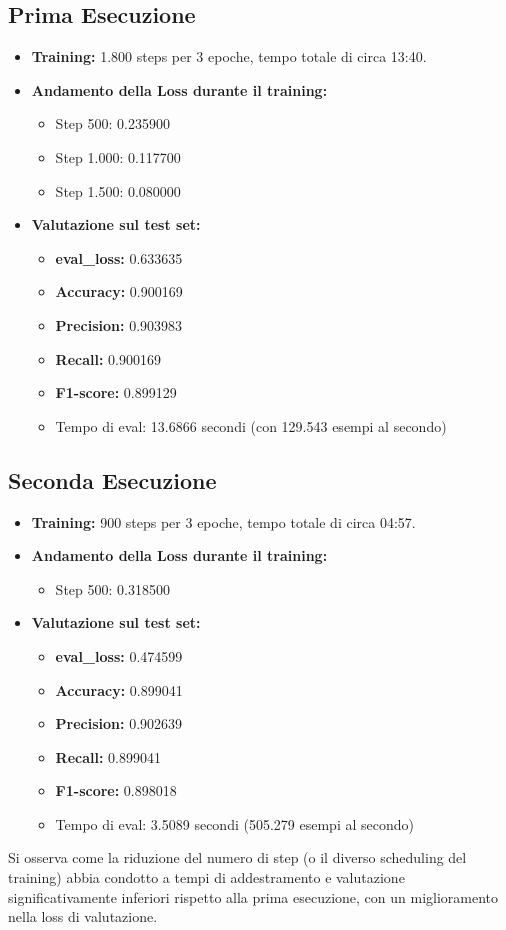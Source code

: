 \documentclass[a4paper,12pt]{article}
\begin{document}
\subsection{Prima Esecuzione}
\begin{itemize}
    \item \textbf{Training:} 1.800 steps per 3 epoche, tempo totale di circa 13:40.
    \item \textbf{Andamento della Loss durante il training:}
    \begin{itemize}
        \item Step 500: 0.235900
        \item Step 1.000: 0.117700
        \item Step 1.500: 0.080000
    \end{itemize}
    \item \textbf{Valutazione sul test set:}
    \begin{itemize}
        \item \textbf{eval\_loss:} 0.633635
        \item \textbf{Accuracy:} 0.900169
        \item \textbf{Precision:} 0.903983
        \item \textbf{Recall:} 0.900169
        \item \textbf{F1-score:} 0.899129
        \item Tempo di eval: 13.6866 secondi (con 129.543 esempi al secondo)
    \end{itemize}
\end{itemize}

\subsection{Seconda Esecuzione}
\begin{itemize}
    \item \textbf{Training:} 900 steps per 3 epoche, tempo totale di circa 04:57.
    \item \textbf{Andamento della Loss durante il training:}
    \begin{itemize}
        \item Step 500: 0.318500
    \end{itemize}
    \item \textbf{Valutazione sul test set:}
    \begin{itemize}
        \item \textbf{eval\_loss:} 0.474599
        \item \textbf{Accuracy:} 0.899041
        \item \textbf{Precision:} 0.902639
        \item \textbf{Recall:} 0.899041
        \item \textbf{F1-score:} 0.898018
        \item Tempo di eval: 3.5089 secondi (505.279 esempi al secondo)
    \end{itemize}
\end{itemize}
Si osserva come la riduzione del numero di step (o il diverso scheduling del training) abbia condotto a tempi di addestramento e valutazione significativamente inferiori rispetto alla prima esecuzione, con un miglioramento nella loss di valutazione.
\end{document}
